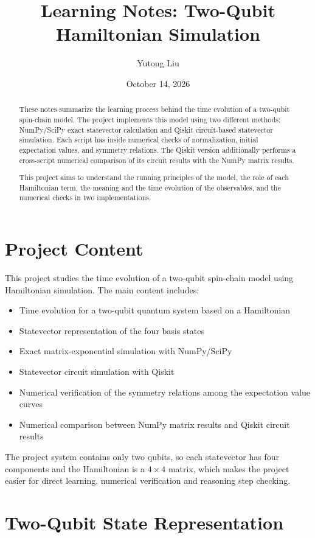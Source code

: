 \documentclass[11pt]{article}
\title{Learning Notes: Two-Qubit Hamiltonian Simulation}
\author{Yutong Liu}
\date{October 14, 2026}
\numberwithin{equation}{section}
\begin{document}
\maketitle

\begin{abstract}
These notes summarize the learning process behind the time evolution of a two-qubit spin-chain model. The project implements this model using two different methods: NumPy/SciPy exact statevector calculation and Qiskit circuit-based statevector simulation. Each script has inside numerical checks of normalization, initial expectation values, and symmetry relations. The Qiskit version additionally performs a cross-script numerical comparison of its circuit results with the NumPy matrix results.

This project aims to understand the running principles of the model, the role of each Hamiltonian term, the meaning and the time evolution of the observables, and the numerical checks in two implementations.
\end{abstract}

\section{Project Content}
This project studies the time evolution of a two-qubit spin-chain model using Hamiltonian simulation. The main content includes:
\begin{itemize}
  \item Time evolution for a two-qubit quantum system based on a Hamiltonian
  \item Statevector representation of the four basis states
  \item Exact matrix-exponential simulation with NumPy/SciPy
  \item Statevector circuit simulation with Qiskit
  \item Numerical verification of the symmetry relations among the expectation value curves
  \item Numerical comparison between NumPy matrix results and Qiskit circuit results
\end{itemize}

The project system contains only two qubits, so each statevector has four components and the Hamiltonian is a $4 \times 4$ matrix, which makes the project easier for direct learning, numerical verification and reasoning step checking.



\section{Two-Qubit State Representation}
\end{document}

